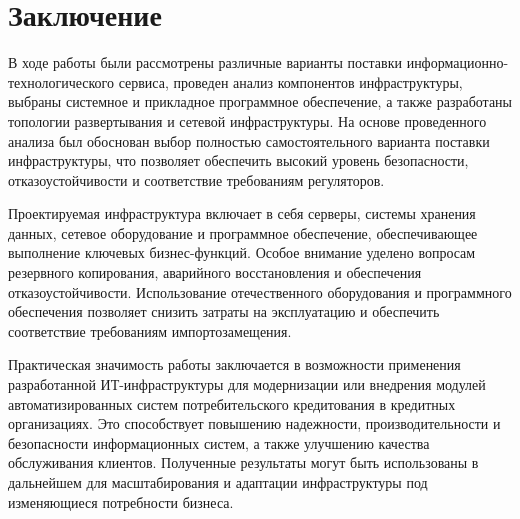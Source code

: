 \documentclass[14pt, a4paper]{extarticle}
\begin{document}
\section{Заключение}
В ходе работы были рассмотрены различные варианты поставки информационно-технологического сервиса, проведен анализ компонентов инфраструктуры, выбраны системное и прикладное программное обеспечение, а также разработаны топологии развертывания и сетевой инфраструктуры. На основе проведенного анализа был обоснован выбор полностью самостоятельного варианта поставки инфраструктуры, что позволяет обеспечить высокий уровень безопасности, отказоустойчивости и соответствие требованиям регуляторов.

Проектируемая инфраструктура включает в себя серверы, системы хранения данных, сетевое оборудование и программное обеспечение, обеспечивающее выполнение ключевых бизнес-функций. Особое внимание уделено вопросам резервного копирования, аварийного восстановления и обеспечения отказоустойчивости. Использование отечественного оборудования и программного обеспечения позволяет снизить затраты на эксплуатацию и обеспечить соответствие требованиям импортозамещения.

Практическая значимость работы заключается в возможности применения разработанной ИТ-инфраструктуры для модернизации или внедрения модулей автоматизированных систем потребительского кредитования в кредитных организациях. Это способствует повышению надежности, производительности и безопасности информационных систем, а также улучшению качества обслуживания клиентов. Полученные результаты могут быть использованы в дальнейшем для масштабирования и адаптации инфраструктуры под изменяющиеся потребности бизнеса.

\begingroup
\let\itshape\upshape
\sloppy
\raggedright
\printbibliography[title=СПИСОК ИСПОЛЬЗУЕМЫХ ИСТОЧНИКОВ]
{}
\endgroup
\end{document}
